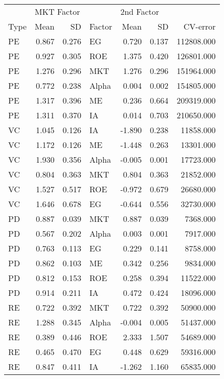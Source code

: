 \documentclass[12pt]{article}
\begin{document}
\begin{table}[ht]
	\centering
	\begin{tabular}{lrrlrrr}
		 & \multicolumn{2}{l}{MKT Factor} & & \multicolumn{2}{l}{2nd Factor} & \\ 
		Type & Mean & SD & Factor & Mean & SD & CV-error \\ 
		\hline
		\hline
PE & 0.867 & 0.276 & EG & 0.720 & 0.137 & 112808.000 \\ 
PE & 0.927 & 0.305 & ROE & 1.375 & 0.420 & 126801.000 \\ 
PE & 1.276 & 0.296 & MKT & 1.276 & 0.296 & 151964.000 \\ 
PE & 0.772 & 0.238 & Alpha & 0.004 & 0.002 & 154805.000 \\ 
PE & 1.317 & 0.396 & ME & 0.236 & 0.664 & 209319.000 \\ 
PE & 1.311 & 0.370 & IA & 0.014 & 0.703 & 210650.000 \\ 
\hline
VC & 1.045 & 0.126 & IA & -1.890 & 0.238 & 11858.000 \\ 
VC & 1.172 & 0.126 & ME & -1.448 & 0.263 & 13301.000 \\ 
VC & 1.930 & 0.356 & Alpha & -0.005 & 0.001 & 17723.000 \\ 
VC & 0.804 & 0.363 & MKT & 0.804 & 0.363 & 21852.000 \\ 
VC & 1.527 & 0.517 & ROE & -0.972 & 0.679 & 26680.000 \\ 
VC & 1.646 & 0.678 & EG & -0.644 & 0.556 & 32730.000 \\ 
\hline
PD & 0.887 & 0.039 & MKT & 0.887 & 0.039 & 7368.000 \\ 
PD & 0.567 & 0.202 & Alpha & 0.003 & 0.001 & 7917.000 \\ 
PD & 0.763 & 0.113 & EG & 0.229 & 0.141 & 8758.000 \\ 
PD & 0.862 & 0.103 & ME & 0.342 & 0.256 & 9834.000 \\ 
PD & 0.812 & 0.153 & ROE & 0.258 & 0.394 & 11522.000 \\ 
PD & 0.914 & 0.211 & IA & 0.472 & 0.424 & 18096.000 \\
\hline 
RE & 0.722 & 0.392 & MKT & 0.722 & 0.392 & 50900.000 \\ 
RE & 1.288 & 0.345 & Alpha & -0.004 & 0.005 & 51437.000 \\ 
RE & 0.389 & 0.446 & ROE & 2.333 & 1.507 & 54689.000 \\ 
RE & 0.465 & 0.470 & EG & 0.448 & 0.629 & 59316.000 \\ 
RE & 0.847 & 0.411 & IA & -1.262 & 1.160 & 65835.000 \\ 

\end{tabular}
\end{table}
\end{document}
